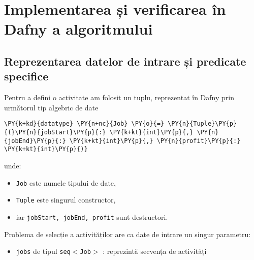 
\lstset{style=mystyle}
\chapter{Implementarea și verificarea în Dafny a algoritmului}

\section{Reprezentarea datelor de intrare și predicate specifice }

Pentru a defini o activitate am folosit un tuplu, reprezentat în Dafny prin următorul tip algebric de date 
\begin{Verbatim}[commandchars=\\\{\}, fontsize=\footnotesize]
\PY{k+kd}{datatype} \PY{n+nc}{Job} \PY{o}{=} \PY{n}{Tuple}\PY{p}{(}\PY{n}{jobStart}\PY{p}{:} \PY{k+kt}{int}\PY{p}{,} \PY{n}{jobEnd}\PY{p}{:} \PY{k+kt}{int}\PY{p}{,} \PY{n}{profit}\PY{p}{:} \PY{k+kt}{int}\PY{p}{)}
\end{Verbatim}
unde:
\begin{itemize}
    \item \texttt{Job} este numele tipului de date, 
    \item \texttt{Tuple} este singurul constructor,
    \item iar \texttt{jobStart, jobEnd, profit} sunt destructori.
\end{itemize}

Problema de selecție a activităților are ca date de intrare un singur parametru:
\begin{itemize}
    \item \texttt{jobs} de tipul \texttt{seq$<$Job$>$} : reprezintă secvența de activități 
\end{itemize}

